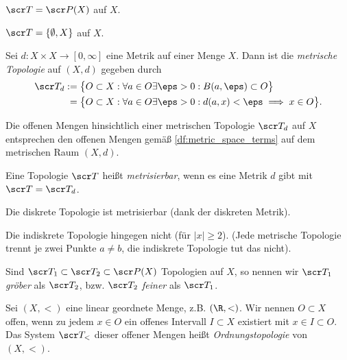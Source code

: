 \begin{ex}
	$\scr T = \scr P(X)$ auf $X$.
\end{ex}

\begin{ex}
	$\scr T = \{\emptyset, X\}$ auf $X$.
\end{ex}

\begin{ex} \label{ex:metric_topology}
	Sei $d: X \times X \to [0,\infty]$ eine Metrik auf einer Menge $X$.
	Dann ist die \emph{metrische Topologie} auf $(X,d)$ gegeben durch
	\begin{align*}
		\scr T_d
		&:= \big\{ O \subset X : \forall a \in O \exists \eps > 0 : B(a,\eps) \subset O \big\} \\
		&\;= \big\{ O \subset X : \forall a \in O \exists \eps > 0 : d(a,x) < \eps \implies x \in O \big\}.
	\end{align*}
	\begin{note}
		Die offenen Mengen hinsichtlich einer metrischen Topologie $\scr T_d$ auf $X$ entsprechen den offenen Mengen gemäß \ref{df:metric_space_terms} auf dem metrischen Raum $(X,d)$.
	\end{note}
\end{ex}

\begin{df}
	Eine Topologie $\scr T$ heißt \emph{metrisierbar}, wenn es eine Metrik $d$ gibt mit $\scr T = \scr T_d$.
\end{df}

\begin{ex}
	Die diskrete Topologie ist metrisierbar (dank der diskreten Metrik).

	Die indiskrete Topologie hingegen nicht (für $|x| \ge 2$).
	(Jede metrische Topologie trennt je zwei Punkte $a \neq b$, die indiskrete Topologie tut das nicht).
\end{ex}

\begin{df}
	Sind $\scr T_1 \subset \scr T_2 \subset \scr P(X)$ Topologien auf $X$, so nennen wir $\scr T_1$ \emph{gröber} als $\scr T_2$, bzw. $\scr T_2$ \emph{feiner} als $\scr T_1$.
\end{df}

\begin{ex}[Ordnungstopologie]
	Sei $(X,<)$ eine linear geordnete Menge, z.B. $(\R,<)$.
	Wir nennen $O \subset X$ offen, wenn zu jedem $x \in O$ ein offenes Intervall $I \subset X$ existiert mit $x \in I \subset O$.
	Das System $\scr T_<$ dieser offener Mengen heißt \emph{Ordnungstopologie} von $(X,<)$.
\end{ex}

